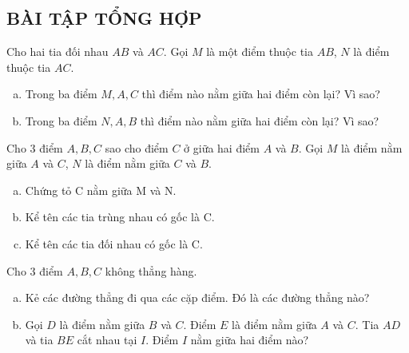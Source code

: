 \begin{bt}
\subsection{BÀI TẬP TỔNG HỢP}
\end{bt}   \begin{bt}
Cho hai tia đối nhau $AB$ và $AC$. Gọi $M$ là một điểm thuộc tia $AB$, $N$ là điểm thuộc tia $AC$.
\begin{enumerate}[a)]
\item	Trong ba điểm $M, A, C$ thì điểm nào nằm giữa hai điểm còn lại? Vì sao?
\item	Trong ba điểm $N, A, B$ thì điểm nào nằm giữa hai điểm còn lại? Vì sao?
\end{enumerate}
\end{bt}   \begin{bt}
Cho $3$ điểm $A, B, C$ sao cho điểm $C$ ở giữa hai điểm $A$ và $B$. Gọi $M$ là điểm nằm giữa $A$ và $C$, $N$ là điểm nằm giữa $C$ và $B$.
\begin{enumerate}[a)]
\item	Chứng tỏ C nằm giữa M và N.
\item	Kể tên các tia trùng nhau có gốc là C.
\item	Kể tên các tia đối nhau có gốc là C.
\end{enumerate}
\end{bt}   \begin{bt}
Cho $3$ điểm $A, B, C$ không thẳng hàng.
\begin{enumerate}[a)]
\item	Kẻ các đường thẳng đi qua các cặp điểm. Đó là các đường thẳng nào?
\item	Gọi $D$ là điểm nằm giữa $B$ và $C$. Điểm $E$ là điểm nằm giữa $A$ và $C$. Tia $AD$ và tia $BE$ cắt nhau tại $I$. Điểm $I$ nằm giữa hai điểm nào?
\end{enumerate}
\end{bt}